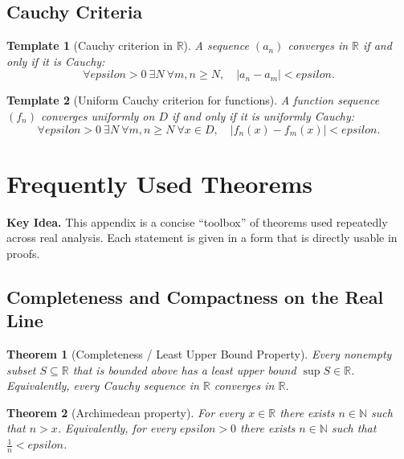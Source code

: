 \documentclass[12pt]{article}
\numberwithin{equation}{section}
\def\eps{epsilon}
\newcommand{\RR}{\mathbb{R}}
\newcommand{\NN}{\mathbb{N}}
\newcommand{\eps}{\varepsilon}               %
\theoremstyle{plain}
\newtheorem{theorem}{Theorem}[section]
\newtheorem{template}{Template}[section]
\theoremstyle{definition}
\theoremstyle{remark}
\newenvironment{keyidea}{\begin{tcolorbox}\textbf{Key Idea.}}{\end{tcolorbox}}
\begin{document}
\subsection{Cauchy Criteria}

\begin{template}[Cauchy criterion in $\RR$]\label{tmp:cauchy_R}
A sequence $(a_n)$ converges in $\RR$ if and only if it is Cauchy:
\[
\forall \eps>0\ \exists N\ \forall m,n\ge N,\quad |a_n-a_m|<\eps.
\]
\end{template}

\begin{template}[Uniform Cauchy criterion for functions]\label{tmp:uniform-cauchy}
A function sequence $(f_n)$ converges uniformly on $D$ if and only if it is uniformly Cauchy:
\[
\forall \eps>0\ \exists N\ \forall m,n\ge N\ \forall x\in D,\quad |f_n(x)-f_m(x)|<\eps.
\]
\end{template}

\newpage

\section{Frequently Used Theorems}

\begin{keyidea}
This appendix is a concise ``toolbox'' of theorems used repeatedly across real analysis.
Each statement is given in a form that is directly usable in proofs.
\end{keyidea}

\subsection{Completeness and Compactness on the Real Line}

\begin{theorem}[Completeness / Least Upper Bound Property]
Every nonempty subset $S\subseteq\RR$ that is bounded above has a least upper bound $\sup S\in\RR$.
Equivalently, every Cauchy sequence in $\RR$ converges in $\RR$.
\end{theorem}

\begin{theorem}[Archimedean property]
For every $x\in\RR$ there exists $n\in\NN$ such that $n>x$.
Equivalently, for every $\eps>0$ there exists $n\in\NN$ such that $\frac{1}{n}<\eps$.
\end{theorem}
\end{document}
